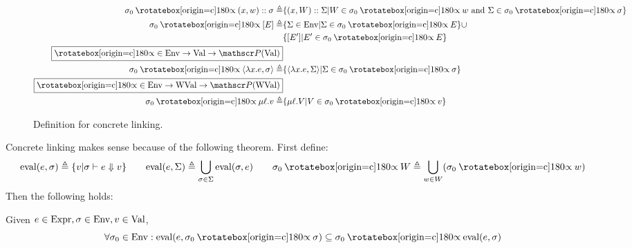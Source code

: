 \begin{figure}
\begin{align*}
    \ctx_0\semlink(x,w)\cons\ctx\triangleq                 & \{(x,W)\cons\Sigma|W\in\ctx_0\semlink w\text{ and }\Sigma\in\ctx_0\semlink\ctx\}                                                                \\
    \ctx_0\semlink[E]\triangleq                            & \{\Sigma\in\Ctx|\Sigma\in\ctx_0\semlink\event\}\cup                                                                                             \\
                                                           & \{[\event']|\event'\in\ctx_0\semlink\event\}                                                                                                    \\
    \fbox{$\semlink\in\Ctx\rightarrow\Value\rightarrow\pset(\Value)$}                                                                                                                                        \\
    \ctx_0\semlink\langle\lambda x.e,\ctx\rangle\triangleq & \{\langle\lambda x.e,\Sigma\rangle|\Sigma\in\ctx_0\semlink\ctx\}                                                                                \\
    \fbox{$\semlink\in\Ctx\rightarrow\Walue\rightarrow\pset(\Walue)$}                                                                                                                                        \\
    \ctx_0\semlink\mu\ell.v\triangleq                      & \{\mu\ell.V|V\in\ctx_0\semlink v\}
  \end{align*}
  \caption{Definition for concrete linking.}
  \label{fig:conclink}
\end{figure}

Concrete linking makes sense because of the following theorem.
First define:
\[\text{eval}(e,\ctx)\triangleq\{v|\ctx\vdash e\Downarrow v\}\qquad\text{eval}(e,\Sigma)\triangleq\bigcup_{\ctx\in\Sigma}\text{eval}(\ctx,e)\qquad\ctx_0\semlink W\triangleq\bigcup_{w\in W}(\ctx_0\semlink w)\]
Then the following holds:
\begin{theorem}\normalfont
  Given $e\in\text{Expr},\sigma\in\text{Env},v\in\text{Val}$,
  \[\forall\ctx_0\in\Ctx:\text{eval}(e,\ctx_0\semlink\ctx)\subseteq\ctx_0\semlink\text{eval}(e,\ctx)\]
\end{theorem}
